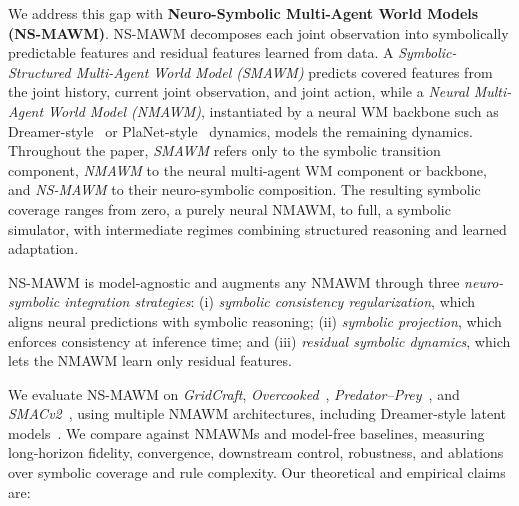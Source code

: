 \documentclass{article}
\theoremstyle{plain}
\theoremstyle{definition}
\theoremstyle{remark}
\begin{document}
We address this gap with \textbf{Neuro-Symbolic Multi-Agent World Models (NS-MAWM)}. NS-MAWM decomposes each joint observation into symbolically predictable features and residual features learned from data. A \emph{Symbolic-Structured Multi-Agent World Model (SMAWM)} predicts covered features from the joint history, current joint observation, and joint action, while a \emph{Neural Multi-Agent World Model (NMAWM)}, instantiated by a neural WM backbone such as Dreamer-style~\cite{hafner2019dreamer} or PlaNet-style~\cite{hafner2018planet} dynamics, models the remaining dynamics. Throughout the paper, \emph{SMAWM} refers only to the symbolic transition component, \emph{NMAWM} to the neural multi-agent WM component or backbone, and \emph{NS-MAWM} to their neuro-symbolic composition. The resulting symbolic coverage ranges from zero, a purely neural NMAWM, to full, a symbolic simulator, with intermediate regimes combining structured reasoning and learned adaptation.

NS-MAWM is model-agnostic and augments any NMAWM through three \emph{neuro-symbolic integration strategies}: (i) \emph{symbolic consistency regularization}, which aligns neural predictions with symbolic reasoning; (ii) \emph{symbolic projection}, which enforces consistency at inference time; and (iii) \emph{residual symbolic dynamics}, which lets the NMAWM learn only residual features.

We evaluate NS-MAWM on \emph{GridCraft}, \emph{Overcooked}~\cite{Micah2020overcooked}, \emph{Predator--Prey}~\cite{lowe2017multi}, and \emph{SMACv2}~\cite{Ellis2023smacv2}, using multiple NMAWM architectures, including Dreamer-style latent models~\cite{hafner2019dreamer}. We compare against NMAWMs and model-free baselines, measuring long-horizon fidelity, convergence, downstream control, robustness, and ablations over symbolic coverage and rule complexity. Our theoretical and empirical claims are:
\end{document}
